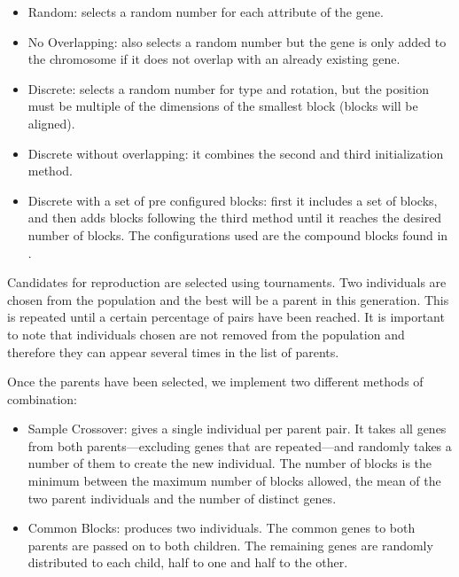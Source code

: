 \documentclass[a4paper,twoside]{article}
\begin{document}
\begin{itemize}
	\item Random: selects a random number for each attribute of the gene.
	\item No Overlapping: also selects a random number but the gene is only 
	added to the chromosome if it does not overlap with an already existing 
	gene.
	\item Discrete: selects a random number for type and rotation, but the 
	position must be multiple of the dimensions of the smallest block (blocks 
	will be aligned).
	\item Discrete without overlapping: it combines the second and third 
	initialization method.
	\item Discrete with a set of pre configured blocks: first it includes
	a set of blocks, and then adds blocks following the third method until
	it reaches the desired number of blocks. The configurations used are the
	compound blocks found in \cite{ferreira2014search}.
\end{itemize}

Candidates for reproduction are selected using tournaments. Two individuals are chosen from the 
population and the best will be a parent in this generation. This is 
repeated until a certain percentage of pairs have been reached. It is important 
to note that individuals chosen are not removed from the population and 
therefore they can appear several times in the list of parents. 

Once the parents have been selected, we implement two different methods of 
combination:
\begin{itemize}
	\item Sample Crossover: gives a single individual per parent pair. It takes 
	all genes from both parents---excluding genes that are repeated---and 
	randomly takes a number of them to create the new individual. The number of 
	blocks is the minimum between the maximum number of blocks allowed, the 
	mean of the two parent individuals and the number of distinct genes.
	\item Common Blocks: produces two individuals. The common genes to both 
	parents are passed on to both children. The remaining genes are randomly 
	distributed to each child, half to one and half to the other. 
	\label{ga:cross2}
\end{itemize}
\end{document}
